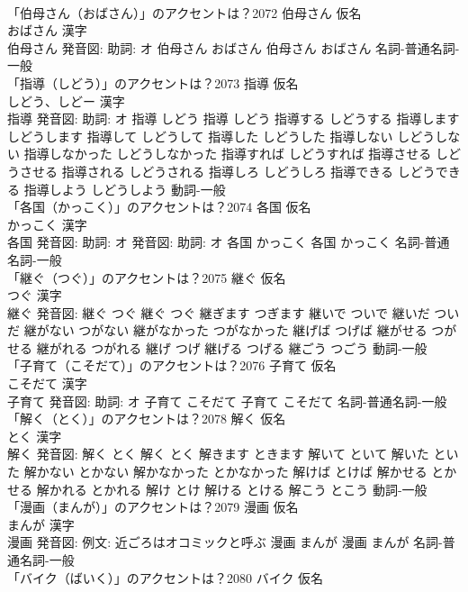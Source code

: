 \documentclass[8pt]{extreport}
\begin{document}
\begin{CJK}{UTF8}{min}
\\	「伯母さん（おばさん）」のアクセントは？2072	伯母さん 仮名　
\\	おばさん 漢字　
\\	伯母さん 発音図: 助詞: オ	伯母さん おばさん		伯母さん おばさん				名詞-普通名詞-一般 
\\	「指導（しどう）」のアクセントは？2073	指導 仮名　
\\	しどう、しどー 漢字　
\\	指導 発音図: 助詞: オ	指導 しどう		指導 しどう 指導する しどうする 指導します しどうします 指導して しどうして 指導した しどうした 指導しない しどうしない 指導しなかった しどうしなかった 指導すれば しどうすれば 指導させる しどうさせる 指導される しどうされる 指導しろ しどうしろ 指導できる しどうできる 指導しよう しどうしよう				動詞-一般 
\\	「各国（かっこく）」のアクセントは？2074	各国 仮名　
\\	かっこく 漢字　
\\	各国 発音図: 助詞: オ 発音図: 助詞: オ	各国 かっこく		各国 かっこく				名詞-普通名詞-一般 
\\	「継ぐ（つぐ）」のアクセントは？2075	継ぐ 仮名　
\\	つぐ 漢字　
\\	継ぐ 発音図:	継ぐ つぐ		継ぐ つぐ 継ぎます つぎます 継いで ついで 継いだ ついだ 継がない つがない 継がなかった つがなかった 継げば つげば 継がせる つがせる 継がれる つがれる 継げ つげ 継げる つげる 継ごう つごう				動詞-一般 
\\	「子育て（こそだて）」のアクセントは？2076	子育て 仮名　
\\	こそだて 漢字　
\\	子育て 発音図: 助詞: オ	子育て こそだて		子育て こそだて				名詞-普通名詞-一般 
\\	「解く（とく）」のアクセントは？2078	解く 仮名　
\\	とく 漢字　
\\	解く 発音図:	解く とく		解く とく 解きます ときます 解いて といて 解いた といた 解かない とかない 解かなかった とかなかった 解けば とけば 解かせる とかせる 解かれる とかれる 解け とけ 解ける とける 解こう とこう				動詞-一般 
\\	「漫画（まんが）」のアクセントは？2079	漫画 仮名　
\\	まんが 漢字　
\\	漫画 発音図: 例文: 近ごろはオコミックと呼ぶ	漫画 まんが		漫画 まんが				名詞-普通名詞-一般 
\\	「バイク（ばいく）」のアクセントは？2080	バイク 仮名　

\end{CJK}
\end{document}
